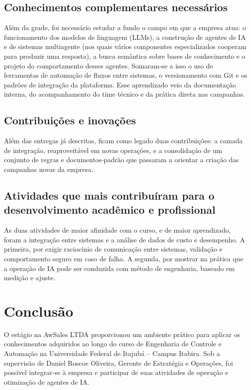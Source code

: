\documentclass[12pt,a4paper,oneside]{article}
\begin{document}
\subsection{Conhecimentos complementares necessários}

Além da grade, foi necessário estudar a fundo o campo em que a empresa atua: o funcionamento dos modelos de linguagem (LLMs), a construção de agentes de IA e de sistemas multiagente (nos quais vários componentes especializados cooperam para produzir uma resposta), a busca semântica sobre bases de conhecimento e o projeto do comportamento desses agentes. Somaram-se a isso o uso de ferramentas de automação de fluxos entre sistemas, o versionamento com Git e os padrões de integração da plataforma. Esse aprendizado veio da documentação interna, do acompanhamento do time técnico e da prática direta nas campanhas.

\subsection{Contribuições e inovações}

Além das entregas já descritas, ficam como legado duas contribuições: a camada de integração, reaproveitável em novas operações, e a consolidação de um conjunto de regras e documentos-padrão que passaram a orientar a criação das campanhas novas da empresa.

\subsection{Atividades que mais contribuíram para o desenvolvimento acadêmico e profissional}

As duas atividades de maior afinidade com o curso, e de maior aprendizado, foram a integração entre sistemas e a análise de dados de custo e desempenho. A primeira, por exigir raciocínio de comunicação entre sistemas, validação e comportamento seguro em caso de falha. A segunda, por mostrar na prática que a operação de IA pode ser conduzida com método de engenharia, baseado em medição e ajuste.

\section{Conclusão}

O estágio na AwSales LTDA proporcionou um ambiente prático para aplicar os conhecimentos adquiridos ao longo do curso de Engenharia de Controle e Automação na Universidade Federal de Itajubá -- Campus Itabira. Sob a supervisão de Daniel Roscoe Oliveira, Gerente de Estratégia e Operações, foi possível integrar-se à empresa e participar de suas atividades de operação e otimização de agentes de IA.
\end{document}
